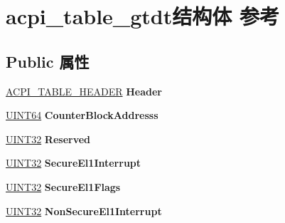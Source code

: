 \hypertarget{structacpi__table__gtdt}{}\section{acpi\+\_\+table\+\_\+gtdt结构体 参考}
\label{structacpi__table__gtdt}
\subsection*{Public 属性}
\begin{DoxyCompactItemize}
\item 
\mbox{\label{structacpi__table__gtdt_a693ff9dabd23076d78f7d0af8a7537e1}} 
\hyperlink{structacpi__table__header}{A\+C\+P\+I\+\_\+\+T\+A\+B\+L\+E\+\_\+\+H\+E\+A\+D\+ER} {\bfseries Header}
\item 
\mbox{\label{structacpi__table__gtdt_a0f98cd770b915b27b063b645116df13d}} 
\hyperlink{_processor_bind_8h_a57be03562867144161c1bfee95ca8f7c}{U\+I\+N\+T64} {\bfseries Counter\+Block\+Addresss}
\item 
\mbox{\label{structacpi__table__gtdt_ad9d4b2d4ddb6b712b4eb73c30a346cd5}} 
\hyperlink{_processor_bind_8h_ae1e6edbbc26d6fbc71a90190d0266018}{U\+I\+N\+T32} {\bfseries Reserved}
\item 
\mbox{\label{structacpi__table__gtdt_a98cf4c61b582dad02e0804f10cad3f75}} 
\hyperlink{_processor_bind_8h_ae1e6edbbc26d6fbc71a90190d0266018}{U\+I\+N\+T32} {\bfseries Secure\+El1\+Interrupt}
\item 
\mbox{\label{structacpi__table__gtdt_af9597a9cda27d9b286228ef6711f5558}} 
\hyperlink{_processor_bind_8h_ae1e6edbbc26d6fbc71a90190d0266018}{U\+I\+N\+T32} {\bfseries Secure\+El1\+Flags}
\item 
\mbox{\label{structacpi__table__gtdt_a98e4815c3f384f4624cba1086c62fe31}} 
\hyperlink{_processor_bind_8h_ae1e6edbbc26d6fbc71a90190d0266018}{U\+I\+N\+T32} {\bfseries Non\+Secure\+El1\+Interrupt}
\item 
\mbox{\label{structacpi__table__gtdt_a73bfdb50f6511321d424ff9b97618213}} 

\end{DoxyCompactItemize}

